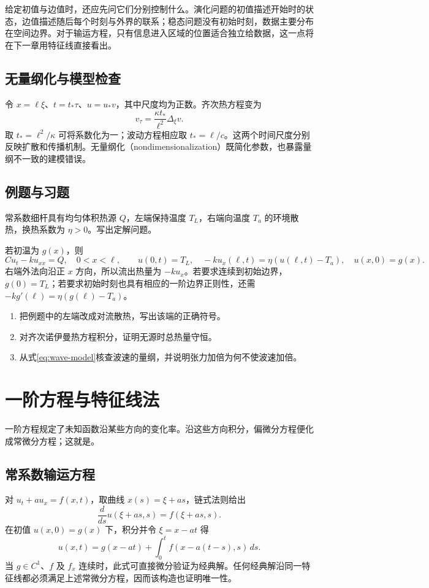 \documentclass[UTF8,12pt,a4paper,fontset=fandol]{ctexbook}
\begin{document}
给定初值与边值时，还应先问它们分别控制什么。演化问题的初值描述开始时的状态，边值描述随后每个时刻与外界的联系；稳态问题没有初始时刻，数据主要分布在空间边界。对于输运方程，只有信息进入区域的位置适合独立给数据，这一点将在下一章用特征线直接看出。

\section{无量纲化与模型检查}
令 $x=\ell\xi$、$t=t_*\tau$、$u=u_*v$，其中尺度均为正数。齐次热方程变为
\[
 v_\tau=\frac{\kappa t_*}{\ell^2}\Delta_\xi v.
\]
取 $t_*=\ell^2/\kappa$ 可将系数化为一；波动方程相应取 $t_*=\ell/c$。这两个时间尺度分别反映扩散和传播机制。无量纲化（nondimensionalization）既简化参数，也暴露量纲不一致的建模错误。

\section{例题与习题}
\begin{example}
常系数细杆具有均匀体积热源 $Q$，左端保持温度 $T_L$，右端向温度 $T_a$ 的环境散热，换热系数为 $\eta>0$。写出定解问题。
\end{example}
\begin{solve}
若初温为 $g(x)$，则
\[
 C u_t-ku_{xx}=Q,\quad 0<x<\ell,\qquad
 u(0,t)=T_L,\quad -k u_x(\ell,t)=\eta(u(\ell,t)-T_a),\quad
 u(x,0)=g(x).
\]
右端外法向沿正 $x$ 方向，所以流出热量为 $-ku_x$。若要求连续到初始边界，$g(0)=T_L$；若要求初始时刻也具有相应的一阶边界正则性，还需 $-kg'(\ell)=\eta(g(\ell)-T_a)$。
\end{solve}
\begin{enumerate}
 \item 把例题中的左端改成对流散热，写出该端的正确符号。
 \item 对齐次诺伊曼热方程积分，证明无源时总热量守恒。
 \item 从式\eqref{eq:wave-model}核查波速的量纲，并说明张力加倍为何不使波速加倍。
\end{enumerate}

\chapter{一阶方程与特征线法}
\label{chap:characteristics}

一阶方程规定了未知函数沿某些方向的变化率。沿这些方向积分，偏微分方程便化成常微分方程；这就是。

\section{常系数输运方程}
对 $u_t+a u_x=f(x,t)$，取曲线 $x(s)=\xi+as$，链式法则给出
\[
 \frac{d}{ds}u(\xi+as,s)=f(\xi+as,s).
\]
在初值 $u(x,0)=g(x)$ 下，积分并令 $\xi=x-at$ 得
\begin{equation}
 u(x,t)=g(x-at)+\int_0^t f(x-a(t-s),s)\,ds.
 \label{eq:transport-solution}
\end{equation}
当 $g\in C^1$、$f$ 及 $f_x$ 连续时，此式可直接微分验证为经典解。任何经典解沿同一特征线都必须满足上述常微分方程，因而该构造也证明唯一性。
\end{document}
